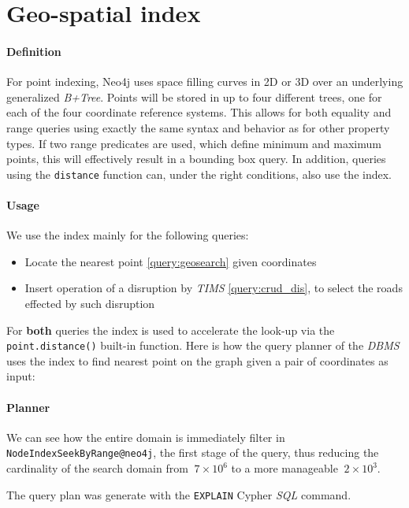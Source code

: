 \section{Geo-spatial index}

\paragraph{Definition}
For point indexing, Neo4j uses space filling curves in 2D or 3D over an 
underlying generalized \textit{B+Tree}. Points will be stored in up to four 
different trees, one for each of the four coordinate reference systems. This 
allows for both equality and range queries using exactly the same syntax and 
behavior as for other property types. If two range predicates are used, which 
define minimum and maximum points, this will effectively result in a bounding 
box query. In addition, queries using the \texttt{distance} function can, under 
the right conditions, also use the index.

\paragraph{Usage}
We use the index mainly for the following queries:

\begin{itemize}
	\item Locate the nearest point \ref{query:geosearch} given coordinates
	
	\item Insert operation of a disruption by \textit{TIMS} \ref{query:crud_dis}, to select the roads effected by such disruption
\end{itemize}

For \textbf{both} queries the index is used to accelerate the look-up via the 
\texttt{point.distance()} built-in function. Here is how the query planner of 
the \textit{DBMS} uses the index to find nearest point on the graph given a 
pair of coordinates as input:

\paragraph{Planner}
We can see how the entire domain is immediately filter in 
\texttt{NodeIndexSeekByRange@neo4j}, the first stage of the query, thus 
reducing the cardinality of the 
search domain from $~7 \times 10^6$ to a more manageable $~ 2 \times 10^3$.

The query plan was generate with the \texttt{EXPLAIN} Cypher \textit{SQL 
}command.


